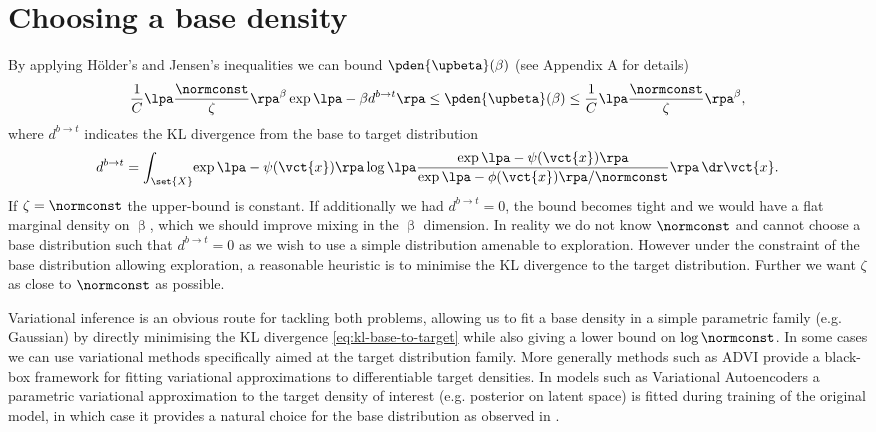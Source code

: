 \section{Choosing a base density}\label{sec:choosing-base-density}

By applying H\"older's and Jensen's inequalities we can bound $\pden{\upbeta}(\beta)$ (see Appendix A for details)
\begin{equation}\label{eq:partition-function-bounds}
  \frac{1}{C}\lpa\frac{\normconst}{\zeta}\rpa^\beta \exp\lpa -\beta d^{b\to t}\rpa
  \leq \pden{\upbeta}(\beta) \leq
  \frac{1}{C}\lpa\frac{\normconst}{\zeta}\rpa^\beta,
\end{equation}
where $d^{b\to t}$ indicates the \ac{KL} divergence from the base to target distribution
\begin{equation}\label{eq:kl-base-to-target}
  d^{b\to t} = \int_{\set{X}}\kern-2pt 
    \exp\lpa -\psi(\vct{x})\rpa \log\lpa\frac{\exp\lpa -\psi(\vct{x})\rpa}{\exp\lpa -\phi(\vct{x})\rpa / \normconst}\rpa
  \,\dr\vct{x}.
\end{equation} 
If $\zeta = \normconst$ the upper-bound is constant. If additionally  we had $d^{b\to t} = 0$, the bound becomes tight and we would have a flat marginal density on $\upbeta$, which we should improve mixing in the $\upbeta$ dimension. In reality we do not know $\normconst$ and cannot choose a base distribution such that $d^{b\to t} = 0$ as we wish to use a simple distribution amenable to exploration. However under the constraint of the base distribution allowing exploration, a reasonable heuristic is to minimise the KL divergence to the target distribution. Further we want $\zeta$ as close to $\normconst$ as possible. 

Variational inference is an obvious route for tackling both problems, allowing us to fit a base density in a simple parametric family (e.g. Gaussian) by directly minimising the KL divergence \eqref{eq:kl-base-to-target} while also giving a lower bound on $\log \normconst$. In some cases we can use variational methods specifically aimed at the target distribution family. More generally methods such as \ac{ADVI} \citep{kucukelbir2016automatic} provide a black-box framework for fitting variational approximations to differentiable target densities. In models such as Variational Autoencoders \citep{kingma2013auto,rezende2014stochastic} a parametric variational approximation to the target density of interest (e.g. posterior on latent space) is fitted during training of the original model, in which case it provides a natural choice for the base distribution as observed in \citep{wu2016quantitative}. 

